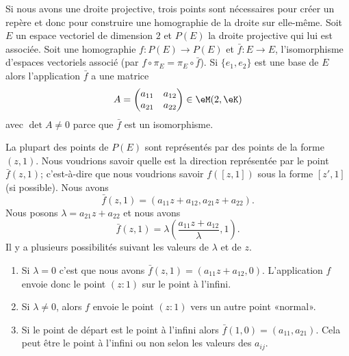 \begin{normaltext}
	Si nous avons une droite projective, trois points sont nécessaires pour créer un repère et donc pour construire une homographie de la droite sur elle-même. Soit \( E\) un espace vectoriel de dimension \( 2\) et \( P(E)\) la droite projective qui lui est associée. Soit une homographie \( f\colon P(E)\to P(E)\) et \( \bar f\colon E\to E\), l'isomorphisme d'espaces vectoriels associé (par \( f\circ\pi_E=\pi_E\circ \bar f\)). Si \( \{ e_1,e_2 \}\) est une base de \( E\) alors l'application \( \bar f\) a une matrice
	\begin{equation}
		A=\begin{pmatrix}
			a_{11} & a_{12} \\
			a_{21} & a_{22}
		\end{pmatrix}\in \eM(2,\eK)
	\end{equation}
	avec \( \det A\neq 0\) parce que \( \bar f\) est un isomorphisme.

	La plupart des points de \( P(E)\) sont représentés par des points de la forme \( (z,1)\). Nous voudrions savoir quelle est la direction représentée par le point \( \bar f(z,1)\); c'est-à-dire que nous voudrions savoir \( f([z,1])\) sous la forme \( [z',1]\) (si possible). Nous avons
	\begin{equation}
		\bar f(z,1)=(a_{11}z+a_{12},a_{21}z+a_{22}).
	\end{equation}
	Nous posons \( \lambda=a_{21}z+a_{22}\) et nous avons
	\begin{equation}
		\bar f(z,1)=\lambda\left( \frac{ a_{11}z+a_{12} }{ \lambda },1 \right).
	\end{equation}
	Il y a plusieurs possibilités suivant les valeurs de \( \lambda\) et de \( z\).

	\begin{enumerate}
		\item
		      Si \( \lambda=0\) c'est que nous avons \( \bar f(z,1)=(a_{11}z+a_{12},0)\). L'application \( f\) envoie donc le point \( (z:1)\) sur le point à l'infini.
		\item
		      Si \( \lambda\neq 0\), alors \( f\) envoie le point \( (z:1)\) vers un autre point «normal».
		\item
		      Si le point de départ est le point à l'infini alors \( \bar f(1,0)=(a_{11},a_{21})\). Cela peut être le point à l'infini ou non selon les valeurs des \( a_{ij}\).
	\end{enumerate}


\end{normaltext}
